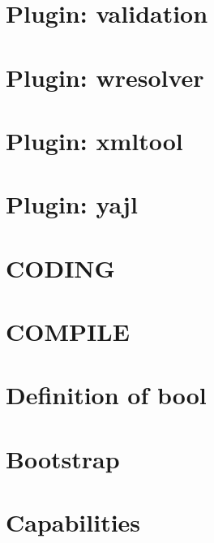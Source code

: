 \documentclass[twoside]{book}
\newcommand{\+}{\discretionary{\mbox{\scriptsize$\hookleftarrow$}}{}{}}
\begin{document}
\chapter{Plugin\+: validation}
\label{md_src_plugins_validation_README}
\hypertarget{md_src_plugins_validation_README}{}

\chapter{Plugin\+: wresolver}
\label{md_src_plugins_wresolver_README}
\hypertarget{md_src_plugins_wresolver_README}{}

\chapter{Plugin\+: xmltool}
\label{md_src_plugins_xmltool_README}
\hypertarget{md_src_plugins_xmltool_README}{}

\chapter{Plugin\+: yajl}
\label{md_src_plugins_yajl_README}
\hypertarget{md_src_plugins_yajl_README}{}

\chapter{C\+O\+D\+I\+N\+G}
\label{doc_CODING_md}
\hypertarget{doc_CODING_md}{}

\chapter{C\+O\+M\+P\+I\+L\+E}
\label{doc_COMPILE_md}
\hypertarget{doc_COMPILE_md}{}

\chapter{Definition of bool}
\label{doc_decisions_bool_md}
\hypertarget{doc_decisions_bool_md}{}

\chapter{Bootstrap}
\label{doc_decisions_bootstrap_md}
\hypertarget{doc_decisions_bootstrap_md}{}

\chapter{Capabilities}
\label{doc_decisions_capabilities_md}
\hypertarget{doc_decisions_capabilities_md}{}

\end{document}
